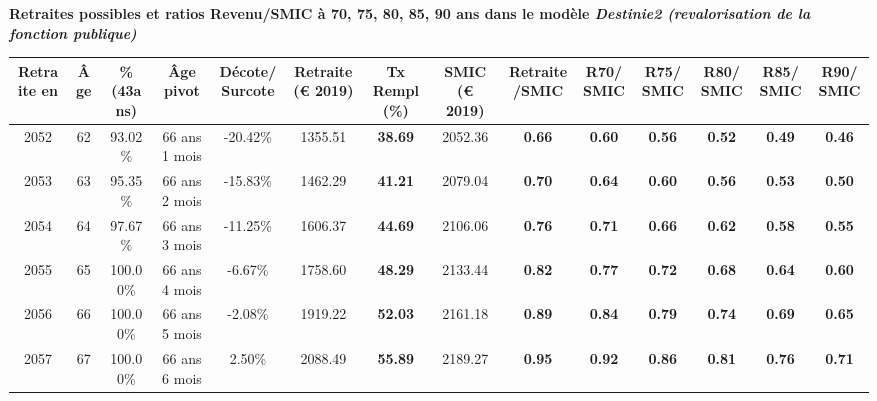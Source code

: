  \vspace{0.1cm} 
{\bf \noindent Retraites possibles et ratios Revenu/SMIC à 70, 75, 80, 85, 90 ans dans le modèle \emph{Destinie2 (revalorisation de la fonction publique)}}  
 
\begin{adjustbox}{max width=\textwidth} 
\begin{tabular}[htb]{|c|c||c|c|c||c|c||c|c||c|c|c|c|c|} 
\hline 
 Retraite en &  Âge &  \%(43ans) &  Âge pivot &  Décote/Surcote &  Retraite (\euro{} 2019) &  Tx Rempl(\%) &  SMIC (\euro{} 2019) &  Retraite/SMIC &  R70/SMIC &  R75/SMIC &  R80/SMIC &  R85/SMIC &  R90/SMIC \\ 
\hline \hline 
 2052 &  62 &  93.02\% &  66 ans 1 mois &  -20.42\% &  1355.51 &  {\bf 38.69} &  2052.36 &  {\bf {\color{red} 0.66}} &  {\bf {\color{red} 0.60}} &  {\bf {\color{red} 0.56}} &  {\bf {\color{red} 0.52}} &  {\bf {\color{red} 0.49}} &  {\bf {\color{red} 0.46}} \\ 
\hline 
 2053 &  63 &  95.35\% &  66 ans 2 mois &  -15.83\% &  1462.29 &  {\bf 41.21} &  2079.04 &  {\bf {\color{red} 0.70}} &  {\bf {\color{red} 0.64}} &  {\bf {\color{red} 0.60}} &  {\bf {\color{red} 0.56}} &  {\bf {\color{red} 0.53}} &  {\bf {\color{red} 0.50}} \\ 
\hline 
 2054 &  64 &  97.67\% &  66 ans 3 mois &  -11.25\% &  1606.37 &  {\bf 44.69} &  2106.06 &  {\bf {\color{red} 0.76}} &  {\bf {\color{red} 0.71}} &  {\bf {\color{red} 0.66}} &  {\bf {\color{red} 0.62}} &  {\bf {\color{red} 0.58}} &  {\bf {\color{red} 0.55}} \\ 
\hline 
 2055 &  65 &  100.00\% &  66 ans 4 mois &  -6.67\% &  1758.60 &  {\bf 48.29} &  2133.44 &  {\bf {\color{red} 0.82}} &  {\bf {\color{red} 0.77}} &  {\bf {\color{red} 0.72}} &  {\bf {\color{red} 0.68}} &  {\bf {\color{red} 0.64}} &  {\bf {\color{red} 0.60}} \\ 
\hline 
 2056 &  66 &  100.00\% &  66 ans 5 mois &  -2.08\% &  1919.22 &  {\bf 52.03} &  2161.18 &  {\bf {\color{red} 0.89}} &  {\bf {\color{red} 0.84}} &  {\bf {\color{red} 0.79}} &  {\bf {\color{red} 0.74}} &  {\bf {\color{red} 0.69}} &  {\bf {\color{red} 0.65}} \\ 
\hline 
 2057 &  67 &  100.00\% &  66 ans 6 mois &  2.50\% &  2088.49 &  {\bf 55.89} &  2189.27 &  {\bf {\color{red} 0.95}} &  {\bf {\color{red} 0.92}} &  {\bf {\color{red} 0.86}} &  {\bf {\color{red} 0.81}} &  {\bf {\color{red} 0.76}} &  {\bf {\color{red} 0.71}} \\ 
\hline 
\hline 
\end{tabular} 
\end{adjustbox} 
 
